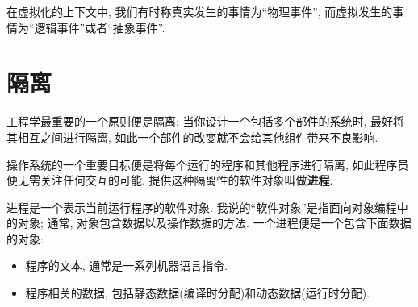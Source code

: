 \documentclass[12pt]{book}
\begin{document}
{%
在虚拟化的上下文中, 我们有时称真实发生的事情为``物理事件'', 
而虚拟发生的事情为``逻辑事件''或者``抽象事件''.

\section{隔离}

工程学最重要的一个原则便是隔离:
当你设计一个包括多个部件的系统时, 最好将其相互之间进行隔离,
如此一个部件的改变就不会给其他组件带来不良影响.

操作系统的一个重要目标便是将每个运行的程序和其他程序进行隔离,
如此程序员便无需关注任何交互的可能.
提供这种隔离性的软件对象叫做{\bf 进程}.

进程是一个表示当前运行程序的软件对象.
我说的``软件对象''是指面向对象编程中的对象;
通常, 对象包含数据以及操作数据的方法.
一个进程便是一个包含下面数据的对象:

\begin{itemize}

\item 程序的文本, 通常是一系列机器语言指令.

\item 程序相关的数据, 包括静态数据(编译时分配)和动态数据(运行时分配).


\end{itemize}}
\end{document}
